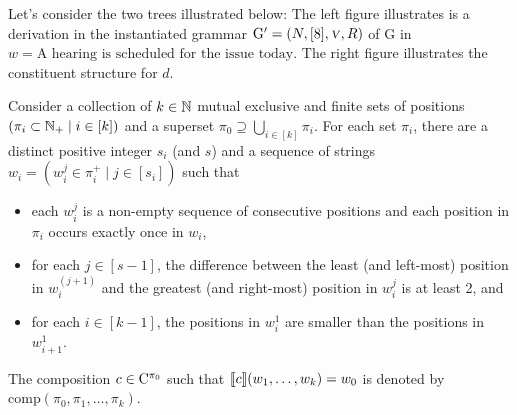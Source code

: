 \documentclass[../../document.tex]{subfiles}
\begin{document}
    \begin{example}\label{ex:lcfrs:deriv}
        Let's consider the two trees illustrated below:
            The left figure illustrates is a derivation in the instantiated grammar \(\mathrm{G'} = (N, [8], \textsc{\textsl{v}}, R)\) of \(\mathrm{G}\) in \(w = \text{A hearing is scheduled for the issue today}\).
            The right figure illustrates the constituent structure for \(d\).

        \null\hfill
        \hfill
        \hfill\null
    \end{example}

    \begin{definition}
        Consider a collection of \(k \in \mathbb{N}\) mutual exclusive and finite sets of positions \((\pi_i \subset \mathbb{N}_+ \mid i \in [k])\) and a superset \(\pi_0 \supseteq \bigcup_{i \in [k]} \pi_i\).
        For each set \(\pi_i\), there are a distinct positive integer \(s_i\) (and \(s\)) and a sequence of strings \(w_i = (w_i^j \in \pi_i^+ \mid j \in [s_i])\) such that
        \begin{itemize}
            \item each \(w_i^j\) is a non-empty sequence of consecutive positions and each position in \(\pi_i\) occurs exactly once in \(w_i\),
            \item for each \(j \in [s-1]\), the difference between the least (and left-most) position in \(w_i^{(j+1)}\) and the greatest (and right-most) position in \(w_i^j\) is at least 2, and
            \item for each \(i \in [k-1]\), the positions in \(w_i^1\) are smaller than the positions in \(w_{i+1}^1\).
        \end{itemize}

        The composition \(c \in \mathrm{C}^{\pi_0}\) such that \(\llbracket c\rrbracket(w_1, \ldots, w_k) = w_0\) is denoted by \(\mathrm{comp}(\pi_0, \pi_1, \ldots, \pi_k)\).
    \end{definition}
\end{document}
